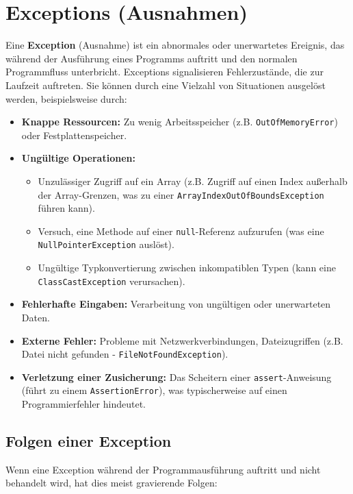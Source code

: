 \chapter{Exceptions (Ausnahmen)}

Eine \textbf{Exception} (Ausnahme) ist ein abnormales oder unerwartetes Ereignis, das während der Ausführung eines Programms auftritt und den normalen Programmfluss unterbricht. Exceptions signalisieren Fehlerzustände, die zur Laufzeit auftreten. Sie können durch eine Vielzahl von Situationen ausgelöst werden, beispielsweise durch:

\begin{itemize}
    \item \textbf{Knappe Ressourcen:} Zu wenig Arbeitsspeicher (z.B. \texttt{OutOfMemoryError}) oder Festplattenspeicher.
    \item \textbf{Ungültige Operationen:}
    \begin{itemize}
        \item Unzulässiger Zugriff auf ein Array (z.B. Zugriff auf einen Index außerhalb der Array-Grenzen, was zu einer \texttt{ArrayIndexOutOfBoundsException} führen kann).
        \item Versuch, eine Methode auf einer \texttt{null}-Referenz aufzurufen (was eine \texttt{NullPointerException} auslöst).
        \item Ungültige Typkonvertierung zwischen inkompatiblen Typen (kann eine \texttt{ClassCastException} verursachen).
    \end{itemize}
    \item \textbf{Fehlerhafte Eingaben:} Verarbeitung von ungültigen oder unerwarteten Daten.
    \item \textbf{Externe Fehler:} Probleme mit Netzwerkverbindungen, Dateizugriffen (z.B. Datei nicht gefunden - \texttt{FileNotFoundException}).
    \item \textbf{Verletzung einer Zusicherung:} Das Scheitern einer \texttt{assert}-Anweisung (führt zu einem \texttt{AssertionError}), was typischerweise auf einen Programmierfehler hindeutet.
\end{itemize}

\section{Folgen einer Exception}

Wenn eine Exception während der Programmausführung auftritt und nicht behandelt wird, hat dies meist gravierende Folgen:

